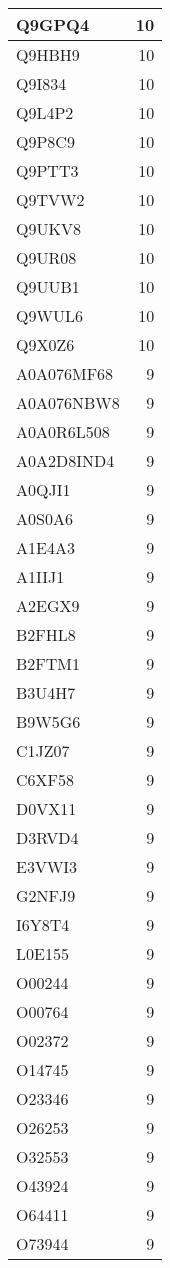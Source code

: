 \documentclass[
]{book}
\theoremstyle{definition}
\theoremstyle{definition}
\theoremstyle{definition}
\theoremstyle{definition}
\theoremstyle{remark}
\begin{document}
\begin{table}
\begin{tabular}{l|r}
\hline
Q9GPQ4 & 10\\
\hline
Q9HBH9 & 10\\
\hline
Q9I834 & 10\\
\hline
Q9L4P2 & 10\\
\hline
Q9P8C9 & 10\\
\hline
Q9PTT3 & 10\\
\hline
Q9TVW2 & 10\\
\hline
Q9UKV8 & 10\\
\hline
Q9UR08 & 10\\
\hline
Q9UUB1 & 10\\
\hline
Q9WUL6 & 10\\
\hline
Q9X0Z6 & 10\\
\hline
A0A076MF68 & 9\\
\hline
A0A076NBW8 & 9\\
\hline
A0A0R6L508 & 9\\
\hline
A0A2D8IND4 & 9\\
\hline
A0QJI1 & 9\\
\hline
A0S0A6 & 9\\
\hline
A1E4A3 & 9\\
\hline
A1IIJ1 & 9\\
\hline
A2EGX9 & 9\\
\hline
B2FHL8 & 9\\
\hline
B2FTM1 & 9\\
\hline
B3U4H7 & 9\\
\hline
B9W5G6 & 9\\
\hline
C1JZ07 & 9\\
\hline
C6XF58 & 9\\
\hline
D0VX11 & 9\\
\hline
D3RVD4 & 9\\
\hline
E3VWI3 & 9\\
\hline
G2NFJ9 & 9\\
\hline
I6Y8T4 & 9\\
\hline
L0E155 & 9\\
\hline
O00244 & 9\\
\hline
O00764 & 9\\
\hline
O02372 & 9\\
\hline
O14745 & 9\\
\hline
O23346 & 9\\
\hline
O26253 & 9\\
\hline
O32553 & 9\\
\hline
O43924 & 9\\
\hline
O64411 & 9\\
\hline
O73944 & 9\\

\end{tabular}
\end{table}
\end{document}
